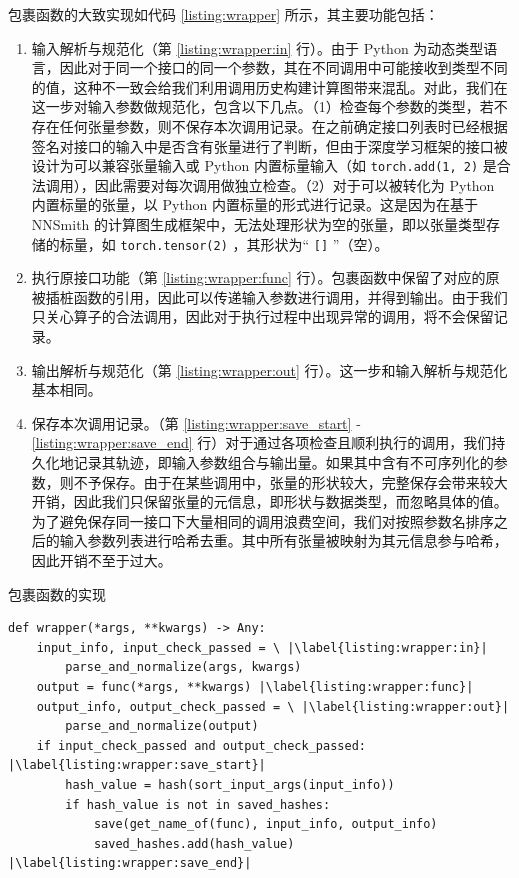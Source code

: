 包裹函数的大致实现如代码 \ref{listing:wrapper} 所示，其主要功能包括：

\begin{enumerate}
    \item 输入解析与规范化（第 \ref{listing:wrapper:in} 行）。由于 Python 为动态类型语言，因此对于同一个接口的同一个参数，其在不同调用中可能接收到类型不同的值，这种不一致会给我们利用调用历史构建计算图带来混乱。对此，我们在这一步对输入参数做规范化，包含以下几点。（1）检查每个参数的类型，若不存在任何张量参数，则不保存本次调用记录。在之前确定接口列表时已经根据签名对接口的输入中是否含有张量进行了判断，但由于深度学习框架的接口被设计为可以兼容张量输入或 Python 内置标量输入（如 \texttt{torch.add(1, 2)} 是合法调用），因此需要对每次调用做独立检查。（2）对于可以被转化为 Python 内置标量的张量，以 Python 内置标量的形式进行记录。这是因为在基于 NNSmith 的计算图生成框架中，无法处理形状为空的张量，即以张量类型存储的标量，如 \texttt{torch.tensor(2)} ，其形状为“ \texttt{[]} ”（空）。
    \item 执行原接口功能（第 \ref{listing:wrapper:func} 行）。包裹函数中保留了对应的原被插桩函数的引用，因此可以传递输入参数进行调用，并得到输出。由于我们只关心算子的合法调用，因此对于执行过程中出现异常的调用，将不会保留记录。
    \item 输出解析与规范化（第 \ref{listing:wrapper:out} 行）。这一步和输入解析与规范化基本相同。
    \item 保存本次调用记录。（第 \ref{listing:wrapper:save_start} - \ref{listing:wrapper:save_end} 行）对于通过各项检查且顺利执行的调用，我们持久化地记录其轨迹，即输入参数组合与输出量。如果其中含有不可序列化的参数，则不予保存。由于在某些调用中，张量的形状较大，完整保存会带来较大开销，因此我们只保留张量的元信息，即形状与数据类型，而忽略具体的值。为了避免保存同一接口下大量相同的调用浪费空间，我们对按照参数名排序之后的输入参数列表进行哈希去重。其中所有张量被映射为其元信息参与哈希，因此开销不至于过大。
\end{enumerate}

\begin{listing}[]
    \caption{包裹函数的实现}
    \label{listing:wrapper}
\begin{verbatim}
def wrapper(*args, **kwargs) -> Any:
    input_info, input_check_passed = \ |\label{listing:wrapper:in}|
        parse_and_normalize(args, kwargs)
    output = func(*args, **kwargs) |\label{listing:wrapper:func}|
    output_info, output_check_passed = \ |\label{listing:wrapper:out}|
        parse_and_normalize(output)
    if input_check_passed and output_check_passed: |\label{listing:wrapper:save_start}|
        hash_value = hash(sort_input_args(input_info))
        if hash_value is not in saved_hashes:
            save(get_name_of(func), input_info, output_info)
            saved_hashes.add(hash_value) |\label{listing:wrapper:save_end}|
\end{verbatim}
\end{listing}

